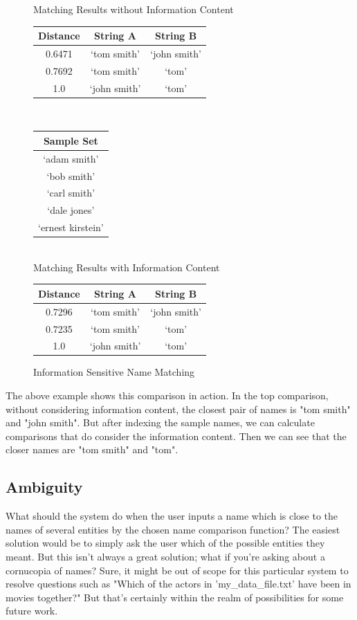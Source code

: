 \documentclass[11pt]{article}
\begin{document}
\begin{figure}[h!]
    \centering
Matching Results without Information Content\\
\begin{tabular}{c|c|c}
  Distance & String A & String B \\
\hline
  0.6471 & `tom smith' & `john smith' \\
  0.7692 & `tom smith' & `tom' \\
  1.0 & `john smith' & `tom'
\end{tabular}
\\
\begin{tabular}{ c}
Sample Set\\
\hline
`adam smith' \\
`bob smith' \\
`carl smith' \\
`dale jones' \\
`ernest kirstein'
\end{tabular}
\\
Matching Results with Information Content\\
\begin{tabular}{c|c|c}
  Distance & String A & String B \\
\hline
  0.7296 & `tom smith' & `john smith' \\
  0.7235 & `tom smith' & `tom' \\
  1.0 & `john smith' & `tom'
\end{tabular}
\caption{Information Sensitive Name Matching}
\label{fig:lev_comp}
\end{figure}

The above example shows this comparison in action. In the top comparison,
without considering information content, the closest pair of names is
"tom smith" and "john smith". But after indexing the sample names, we
can calculate comparisons that do consider the information content. Then
we can see that the closer names are "tom smith" and "tom".

\subsection{Ambiguity}
What should the system do when the user inputs a name which is close
to the names of several entities by the chosen name comparison
function? The easiest solution would be to simply ask the user which
of the possible entities they meant. But this isn't always a great
solution; what if you're asking about a cornucopia of names?
Sure, it might be out of scope for this particular system to
resolve questions such as "Which of the actors in 'my\_data\_file.txt'
have been in movies together?" But that's certainly within the
realm of possibilities for some future work.
\end{document}
